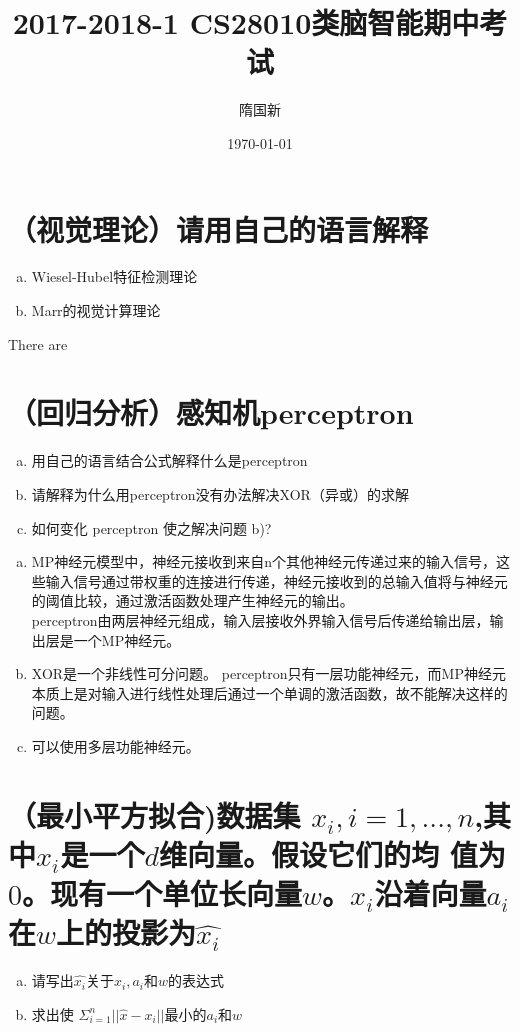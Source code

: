 \documentclass[11pt]{article}
\title{2017-2018-1 CS28010类脑智能期中考试}
\author{隋国新}
\date{\today}
\newenvironment{answer}{\par\color{MidnightBlue}}{\par}
\begin{document}
\maketitle

\section{（视觉理论）请用自己的语言解释}
\begin{enumerate}[(a)]
    \item Wiesel-Hubel特征检测理论
    \item Marr的视觉计算理论
\end{enumerate}

\begin{answer}
  There are
\end{answer}

\section{（回归分析）感知机perceptron}
\begin{enumerate}[(a)]
    \item 用自己的语言结合公式解释什么是perceptron
    \item 请解释为什么用perceptron没有办法解决XOR（异或）的求解
    \item 如何变化 perceptron 使之解决问题 b)?
\end{enumerate}

\begin{answer}
\begin{enumerate}[(a)]
    \item MP神经元模型中，神经元接收到来自n个其他神经元传递过来的输入信号，这些输入信号通过带权重的连接进行传递，神经元接收到的总输入值将与神经元的阈值比较，通过激活函数处理产生神经元的输出。 \\
    perceptron由两层神经元组成，输入层接收外界输入信号后传递给输出层，输出层是一个MP神经元。
    \item XOR是一个非线性可分问题。 perceptron只有一层功能神经元，而MP神经元本质上是对输入进行线性处理后通过一个单调的激活函数，故不能解决这样的问题。
    \item 可以使用多层功能神经元。
\end{enumerate}
\end{answer}

\section{（最小平方拟合)数据集 ${x_i}, i = 1,..., n$,其中$x_i$是一个$d$维向量。假设它们的均
值为$0$。现有一个单位长向量$w$。$x_i$沿着向量$a_i$在$w$上的投影为$\hat{x_i}$}
\begin{enumerate}[(a)]
    \item 请写出$\hat{x_i}$关于$x_i, a_i$和$w$的表达式
    \item 求出使 $\Sigma_{i=1}^n||\hat{x}-x_i||$最小的$a_i$和$w$
\end{enumerate}
\end{document}
